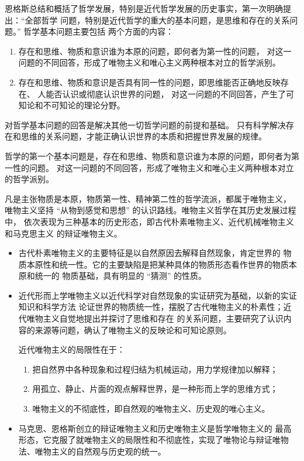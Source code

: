 \documentclass[utf-8, 10pt]{article}
\begin{document}
恩格斯总结和概括了哲学发展，特别是近代哲学发展的历史事实，第一次明确提出：“全部哲学
问题，特别是近代哲学的重大的基本问题，是思维和存在的关系问题。” 哲学基本问题主要包括
两个方面的内容：
\begin{enumerate}[label={$\left.\arabic*\right)$}, itemsep=0pt]
    \item 存在和思维、物质和意识谁为本原的问题，即何者为第一性的问题，
    对这一问题的不同回答，形成了唯物主义和唯心主义两种根本对立的哲学派别。
    \item 存在和思维、物质和意识是否具有同一性的问题，即思维能否正确地反映存在、
    人能否认识或彻底认识世界的问题，
    对这一问题的不同回答，产生了可知论和不可知论的理论分野。
\end{enumerate}
对哲学基本问题的回答是解决其他一切哲学问题的前提和基础。
只有科学解决存在和思维的关系问题，才能正确认识世界的本质和把握世界发展的规律。

\vspace{1em}

哲学的第一个基本问题是，存在和思维、物质和意识谁为本原的问题，即何者为第一性的问题。
对这一问题的不同回答，形成了唯物主义和唯心主义两种根本对立的哲学派别。


凡是主张物质是本原，物质第一性、精神第二性的哲学流派，都属于唯物主义，
唯物主义坚持 “从物到感觉和思想” 的认识路线。唯物主义哲学在其历史发展过程中，
依次表现为三种基本的历史形态，即古代朴素唯物主义、近代机械唯物主义和马克思主义
的辩证唯物主义。
\begin{itemize}[itemsep=0pt]
    \item 古代朴素唯物主义的主要特征是以自然原因去解释自然现象，肯定世界的
    物质本原性和统一性。它的主要缺陷是把某种具体的物质形态看作世界的物质本原和统一的
    物质基础，具有明显的 “猜测” 的性质。
    \item 近代形而上学唯物主义以近代科学对自然现象的实证研究为基础，以新的实证知识和科学方法
    论证世界的物质统一性，摆脱了古代唯物主义的朴素性；近代唯物主义自觉地提出并探讨了思维和存在
    的关系问题，主要研究了认识内容的来源等问题，确认了唯物主义的反映论和可知论原则。

    近代唯物主义的局限性在于：
    \begin{enumerate}[label={${\arabic*}^\circ$}, itemsep=0pt]
        \item 把自然界中各种现象和过程归结为机械运动，用力学规律加以解释；
        \item 用孤立、静止、片面的观点解释世界，是一种形而上学的思维方式；
        \item 唯物主义的不彻底性，即自然观的唯物主义、历史观的唯心主义。
    \end{enumerate}
    \item 马克思、恩格斯创立的辩证唯物主义和历史唯物主义是哲学唯物主义的
    最高形态，它克服了就唯物主义的局限性和不彻底性，实现了唯物论与辩证唯物
    法、唯物主义的自然观与历史观的统一。
\end{itemize}
\end{document}
